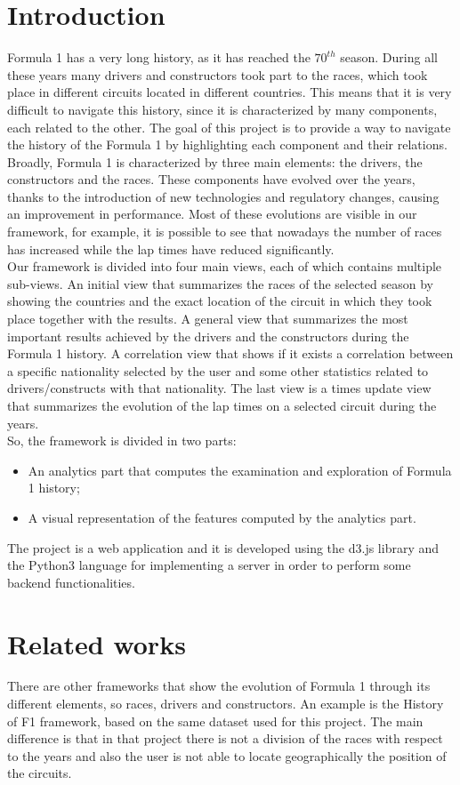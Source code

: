 \documentclass[11pt,twocolumn,letterpaper]{article}
\begin{document}
\section{Introduction}
Formula 1 has a very long history, as it has reached the $70^{th}$ season. During all these years many drivers and constructors took part to the races, which took place in different circuits located in different countries. This means that it is very difficult to navigate this history, since it is characterized by many components, each related to the other. The goal of this project is to provide a way to navigate the history of the Formula 1 by highlighting each component and their relations. Broadly, Formula 1 is characterized by three main elements: the drivers, the constructors and the races. These components have evolved over the years, thanks to the introduction of new technologies and regulatory changes, causing an improvement in performance. Most of these evolutions are visible in our framework, for example, it is possible to see that nowadays the number of races has increased while the lap times have reduced significantly.\\
Our framework is divided into four main views, each of which contains multiple sub-views. An initial view that summarizes the races of the selected season by showing the countries and the exact location of the circuit in which they took place together with the results. A general view that summarizes the most important results achieved by the drivers and the constructors during the Formula 1 history. A correlation view that shows if it exists a correlation between a specific nationality selected by the user and some other statistics related to drivers/constructs with that nationality. The last view is a times update view that summarizes the evolution of the lap times on a selected circuit during the years.\\
So, the framework is divided in two parts:
\begin{itemize}
	\item An analytics part that computes the examination and exploration of Formula 1 history;
	\item A visual representation of the features computed by the analytics part.
\end{itemize}
The project is a web application and it is developed using the d3.js \cite{D3} library and the Python3 language for implementing a server in order to perform some backend functionalities.

\section{Related works}
There are other frameworks that show the evolution of Formula 1 through its different elements, so races, drivers and constructors. An example is the History of F1 \cite{HistoryOfF1} framework, based on the same dataset used for this project. The main difference is that in that project there is not a division of the races with respect to the years and also the user is not able to locate geographically the position of the circuits. 
\end{document}
